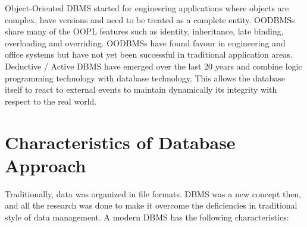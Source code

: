 Object-Oriented DBMS started for engineering applications where objects are complex,
have versions and need to be treated as a complete entity. OODBMSs share many of the OOPL features such as identity, inheritance, late binding, overloading and overriding.
OODBMSs have found favour in engineering and office systems but have not yet been successful in traditional application areas. Deductive / Active DBMS have emerged over the last 20 years and combine logic programming technology with database technology. This allows the database itself to react to external events to maintain dynamically its integrity with respect to the real world.

\thispagestyle{fancy}

\section{Characteristics of Database Approach }
Traditionally, data was organized in file formats. DBMS was a new concept then, and all the research was done to make it overcome the deficiencies in traditional style of data management. A modern DBMS has the following characteristics:
